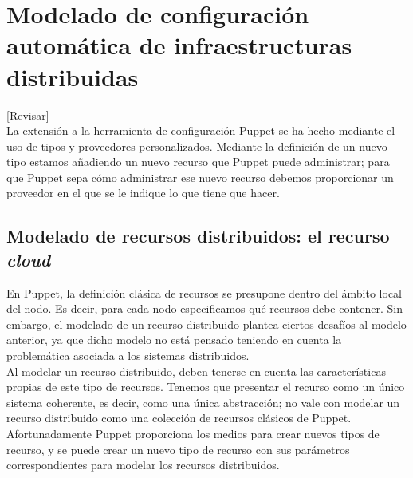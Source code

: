 \chapter{Modelado de configuración automática de infraestructuras distribuidas}
\label{cap:modelado}

[Revisar]\\

La extensión a la herramienta de configuración Puppet se ha hecho mediante el uso de tipos y proveedores personalizados. Mediante la definición de un nuevo tipo estamos añadiendo un nuevo recurso que Puppet puede administrar; para que Puppet sepa cómo administrar ese nuevo recurso debemos proporcionar un proveedor en el que se le indique lo que tiene que hacer.


\section{Modelado de recursos distribuidos: el recurso \emph{cloud}}

En Puppet, la definición clásica de recursos se presupone dentro del ámbito local del nodo. Es decir, para cada nodo especificamos qué recursos debe contener. Sin embargo, el modelado de un recurso distribuido plantea ciertos desafíos al modelo anterior, ya que dicho modelo no está pensado teniendo en cuenta la problemática asociada a los sistemas distribuidos. \\


Al modelar un recurso distribuido, deben tenerse en cuenta las características propias de este tipo de recursos. Tenemos que presentar el recurso como un único sistema coherente, es decir, como una única abstracción; no vale con modelar un recurso distribuido como una colección de recursos clásicos de Puppet. Afortunadamente Puppet proporciona los medios para crear nuevos tipos de recurso, y se puede crear un nuevo tipo de recurso con sus parámetros correspondientes para modelar los recursos distribuidos. \\

